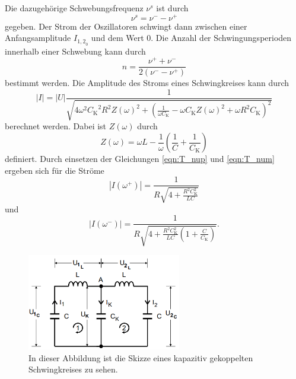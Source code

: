 Die dazugehörige Schwebungsfrequenz $\nu^s$ ist durch 
\begin{equation}
    \label{eqn:T_Schwebung}
    \nu^s = \nu^- -\nu^+
\end{equation}
gegeben. Der Strom der Oszillatoren schwingt dann zwischen einer Anfangsamplitude $I_{{1,2}_0}$ und dem Wert $0$.
Die Anzahl der Schwingungsperioden innerhalb einer Schwebung kann durch
\begin{equation}
    \label{eqn:T_n}
    n = \frac{\nu^+ + \nu^-}{2\left(\nu^- - \nu^+\right)} 
\end{equation}
bestimmt werden.  
Die Amplitude des Stroms eines Schwingkreises kann durch 
\begin{equation}
    \label{eqn:STROM}
    |I| = |U|\frac{1}{\sqrt{4\omega^2{C_\text{K}}^2R^2Z(\omega)^2+\left(\frac{1}{\omega C_\text{K}}-\omega C_\text{K}Z(\omega)^2+\omega R^2C_\text{K}\right)^2}}
\end{equation}
berechnet werden.
Dabei ist $Z(\omega)$ durch
\begin{equation*}
    Z(\omega) = \omega L - \frac{1}{\omega}\left(\frac{1}{C} + \frac{1}{C_\text{K}}\right)
\end{equation*}
definiert.
Durch einsetzen der Gleichungen \eqref{eqn:T_nup} und \eqref{eqn:T_num} ergeben sich für die Ströme
\begin{equation}
    \label{eqn:Ip_theo}
    |I(\omega^+)| = \frac{1}{R\sqrt{4 + \frac{R^2C_\text{K}^2}{LC}}}
\end{equation}
und 
\begin{equation}
    \label{eqn:Im_theo}
    |I(\omega^-)| = \frac{1}{R\sqrt{4 + \frac{R^2C_\text{K}^2}{LC}\left(1 + \frac{C}{C_\text{K}}\right)}}.
\end{equation}
\begin{figure}
    \centering
    \includegraphics[width = 0.6\textwidth]{content/SkizzegekoppelterSchwingkreis.PNG}
    \caption{In dieser Abbildung ist die Skizze eines kapazitiv gekoppelten Schwingkreises zu sehen. \cite{v355}}
    \label{fig:T_skgS}
\end{figure}

